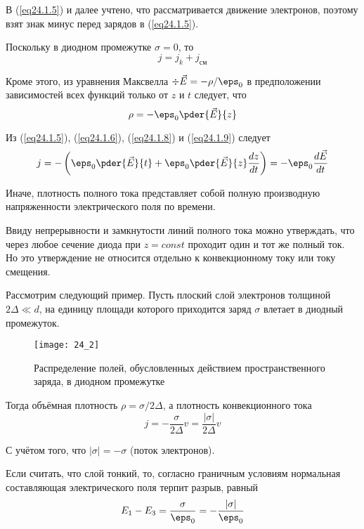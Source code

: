 В (\ref{eq24.1.5}) и далее учтено, что рассматривается движение электронов, 
поэтому взят знак минус перед зарядов в (\ref{eq24.1.5}).

Поскольку в диодном промежутке \( \sigma = 0 \), то 
\begin{equation}
	j = j_k + j_\text{см}
	\label{eq24.1.8}
\end{equation}

Кроме этого, из уравнения Максвелла \( \div\vec{E} = -\rho/\eps_0 \) в 
предположении зависимостей всех функций только от \( z \) и \( t \) следует, 
что 
\begin{equation}
	\rho = -\eps_0 \pder{\vec{E}}{z}
	\label{eq24.1.9}
\end{equation}

Из (\ref{eq24.1.5}), (\ref{eq24.1.6}), (\ref{eq24.1.8}) и (\ref{eq24.1.9}) следует 
\[
	j = -\left( 
		\eps_0\pder{\vec{E}}{t} + \eps_0\pder{\vec{E}}{z}\frac{dz}{dt}
	\right) = -\eps_0 \frac{d\vec{E}}{dt}
\]

Иначе, плотность полного тока представляет собой полную производную 
напряженности электрического поля по времени.

Ввиду непрерывности и замкнутости линий полного тока можно утверждать, что 
через любое сечение диода при \( z = const \) проходит один и тот же полный 
ток. Но это утверждение не относится отдельно к конвекционному току или току 
смещения. 

Рассмотрим следующий пример. Пусть плоский слой электронов толщиной 
\( 2\Delta \ll d \), на единицу площади которого приходится заряд \( \sigma \) 
влетает в диодный промежуток.

\begin{figure}[h!]
	\center
	\texttt{[image: 24\_2]}
	\caption{Распределение полей, обусловленных действием пространственного 
		заряда, в диодном промежутке}
	\label{img24.2}
\end{figure}

Тогда объёмная плотность \( \rho = \sigma / 2\Delta \), а плотность 
конвекционного тока 
\begin{equation}
	j = -\frac{\sigma}{2\Delta}v = \frac{|\sigma|}{2\Delta} v
	\label{eq24.1.11}
\end{equation}

С учётом того, что \( |\sigma| = -\sigma \) (поток электронов).

Если считать, что слой тонкий, то, согласно граничным условиям нормальная 
составляющая электрического поля терпит разрыв, равный 
\begin{equation}
	E_1 - E_3 = \frac{\sigma}{\eps_0} = -\frac{|\sigma|}{\eps_0}
	\label{eq24.1.12}
\end{equation}

